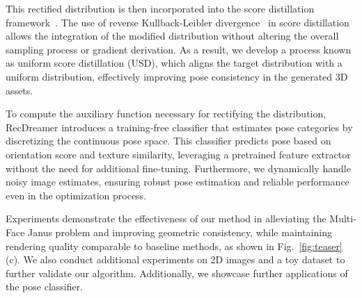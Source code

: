 This rectified distribution is then incorporated into the score distillation framework~\citep{wang2024prolificdreamer}. The use of reverse Kullback-Leibler divergence~\citep{kullback1951information} in score distillation allows the integration of the modified distribution without altering the overall sampling process or gradient derivation. As a result, we develop a process known as uniform score distillation (USD), which aligns the target distribution with a uniform distribution, effectively improving pose consistency in the generated 3D assets.

To compute the auxiliary function necessary for rectifying the distribution, RecDreamer introduces a training-free classifier that estimates pose categories by discretizing the continuous pose space. This classifier predicts pose based on orientation score and texture similarity, leveraging a pretrained feature extractor without the need for additional fine-tuning. Furthermore, we dynamically handle noisy image estimates, ensuring robust pose estimation and reliable performance even in the optimization process.

Experiments demonstrate the effectiveness of our method in alleviating the Multi-Face Janus problem and improving geometric consistency, while maintaining rendering quality comparable to baseline methods, as shown in Fig.~\ref{fig:teaser}(c). We also conduct additional experiments on 2D images and a toy dataset to further validate our algorithm. Additionally, we showcase further applications of the pose classifier.